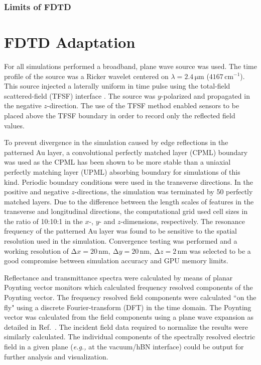 \documentclass[./JimHeneghanDissertation.tex]{subfiles}
\begin{document}
				\subsubsection{Limits of FDTD}

	\section{FDTD Adaptation}

			For all simulations performed a broadband, plane wave source was used. The time profile of the source was a Ricker wavelet \cite{Ricker:43} centered on $\lambda = 2.4\, \si{\um}$ ($4167\, \mathrm{cm}^{-1}$). This source injected a laterally uniform in time pulse using the total-field scattered-field (TFSF) interface \cite{Merewether:80}. The source was $y$-polarized and propagated in the negative $z$-direction. The use of the TFSF method enabled sensors to be placed above the TFSF boundary in order to record only the reflected field values.

			To prevent divergence in the simulation caused by edge reflections in the patterned Au layer, a convolutional perfectly matched layer (CPML) \cite{Gvozdic:17} boundary was used as the CPML has been shown to be more stable than a uniaxial perfectly matching layer (UPML) \cite{Sacks:95} absorbing boundary for simulations of this kind. Periodic boundary conditions were used in the transverse directions. In the positive and negative $z$-directions, the simulation was terminated by 50 perfectly matched layers. Due to the difference between the length scales of features in the transverse and longitudinal directions, the computational grid used cell sizes in the ratio of 10:10:1 in the $x$-, $y$- and $z$-dimensions, respectively. The resonance frequency of the patterned Au layer was found to be sensitive to the spatial resolution used in the simulation. Convergence testing was performed and a working resolution of $\mathrm{\Delta}x = 20 \, \si{\nm}, \ \mathrm{\Delta}y = 20 \, \si{\nm}, \ \mathrm{\Delta}z = 2 \, \si{\nm}$ was selected to be a good compromise between simulation accuracy and GPU memory limits.

			Reflectance and transmittance spectra were calculated by means of planar Poynting vector monitors which calculated frequency resolved components of the Poynting vector. The frequency resolved field components were calculated ``on the fly" using a discrete Fourier-transform (DFT) in the time domain. The Poynting vector was calculated from the field components using a plane wave expansion as detailed in Ref.~\cite{Rumpf:20}. The incident field data required to normalize the results were similarly calculated. The individual components of the spectrally resolved electric field in a given plane (\textit{e.g.,} at the vacuum/hBN interface) could be output for further analysis and visualization.  
\end{document}
